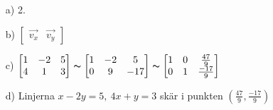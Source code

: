 \begin{itemize}
\item[a) ] 2.
\item[b) ] $\begin{bmatrix}\vec{v_x} & \vec{v_y}\end{bmatrix}$
\item[c) ] $\begin{bmatrix}1&-2&5\\4&1&3\end{bmatrix}\thicksim\begin{bmatrix}1&-2&5\\0&9&-17\end{bmatrix}\thicksim\begin{bmatrix}1&0&\frac{47}{9}\\0&1&\frac{-17}{9}\end{bmatrix}$
\item[d) ] Linjerna $x-2y=5,\ 4x+y=3$ skär i punkten $(\frac{47}{9},\frac{-17}{9} )$
\end{itemize}